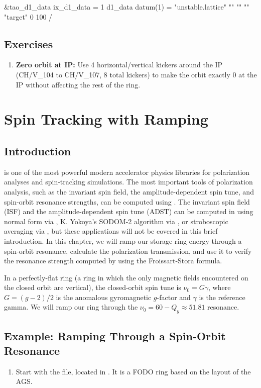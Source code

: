 \documentclass{hitec}     %
\begin{document}
{{{{\begin{enumerate}[leftmargin=*]
\begin{code}
&tao_d1_data
	ix_d1_data = 1
	d1_data%
	datum(1) = "unstable.lattice" "" "" "" "target" 0 100
/
\end{code}

\end{enumerate}

\subsection{Exercises}

\begin{enumerate}[leftmargin=*]
%
\item {\bf Zero orbit at IP:}
Use 4 horizontal/vertical kickers around the IP (CH/V\_104 to CH/V\_107, 8 total kickers) to make the orbit exactly 0 at the IP without affecting the rest of the ring.
%
\end{enumerate}

\newpage

\section{Spin Tracking with Ramping}
\subsection{Introduction}
\bmad is one of the most powerful modern accelerator physics libraries for polarization analyses and spin-tracking simulations. The most important tools of polarization analysis, such as the invariant spin field, the amplitude-dependent spin tune, and spin-orbit resonance strengths, can be computed using \bmad. The invariant spin field (ISF) and the amplitude-dependent spin tune (ADST) can be computed in \bmad using normal form via \tao, K. Yokoya's SODOM-2 algorithm via \sodom, or stroboscopic averaging via \spinstrob, but these applications will not be covered in this brief introduction. In this chapter, we will ramp our storage ring energy through a spin-orbit resonance, calculate the polarization transmission, and use it to verify the resonance strength computed by \tao using the Froissart-Stora formula.

In a perfectly-flat ring (a ring in which the only magnetic fields encountered on the closed orbit are vertical), the closed-orbit spin tune is $\nu_0=G\gamma$, where $G=(g-2)/2$ is the anomalous gyromagnetic $g$-factor and $\gamma$ is the reference gamma. We will ramp our ring through the $\nu_0=60-Q_y \approx 51.81$ resonance. 

\subsection*{Example: Ramping Through a Spin-Orbit Resonance}
\begin{enumerate}[leftmargin=*]
\item Start with the  file, located in . It is a FODO ring based on the layout of the AGS.


\end{enumerate}}}}}
\end{document}
